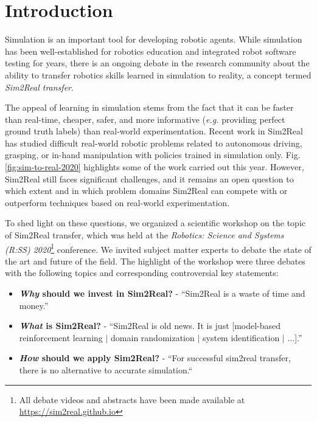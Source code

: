 \section{Introduction}

Simulation is an important tool for developing robotic agents. While simulation has been well-established for robotics education and integrated robot software testing for years, there is an ongoing debate in the research community about the ability to transfer robotics skills learned in simulation to reality, a concept termed \emph{Sim2Real transfer}.

The appeal of learning in simulation stems from the fact that it can be faster than real-time, cheaper, safer, and more informative (\textit{e.g.} providing perfect ground truth labels) than real-world experimentation. Recent work in Sim2Real has studied difficult real-world robotic problems related to autonomous driving, grasping, or in-hand manipulation with policies trained in simulation only. Fig. \ref{fig:sim-to-real-2020} highlights some of the work carried out this year. However, Sim2Real still faces significant challenges, and it remains an open question to which extent and in which problem domains Sim2Real can compete with or outperform techniques based on real-world experimentation.

To shed light on these questions, we organized a scientific workshop on the topic of Sim2Real transfer, which was held at the \emph{Robotics: Science and Systems (R:SS) 2020}\footnote{All debate videos and abstracts have been made available at\\ \url{https://sim2real.github.io}} conference. We invited subject matter experts to debate the state of the art and future of the field. The highlight of the workshop were three debates with the following topics and corresponding controversial key statements:

\begin{itemize}
	\item \textbf{\emph{Why} should we invest in Sim2Real?} - ``Sim2Real is a waste of time and money.''
	\item \textbf{\emph{What} is Sim2Real? }- ``Sim2Real is old news. It is just [model-based reinforcement learning $\vert$ domain randomization $\vert$ system identification $\vert$ $\ldots$].”
	\item \textbf{\emph{How} should we apply Sim2Real?} - ``For successful sim2real transfer, there is no alternative to accurate simulation.“ 
\end{itemize}

